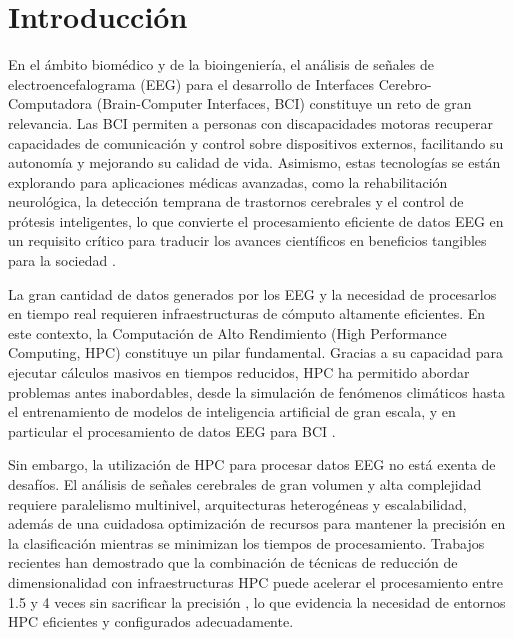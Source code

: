 \chapter{Introducción}\label{cap:introduccion}



En el ámbito biomédico y de la bioingeniería, el análisis de señales de electroencefalograma (\ac{EEG}) para el desarrollo de Interfaces Cerebro-Computadora (Brain-Computer Interfaces, \ac{BCI}) constituye un reto de gran relevancia. Las \ac{BCI} permiten a personas con discapacidades motoras recuperar capacidades de comunicación y control sobre dispositivos externos, facilitando su autonomía y mejorando su calidad de vida. Asimismo, estas tecnologías se están explorando para aplicaciones médicas avanzadas, como la rehabilitación neurológica, la detección temprana de trastornos cerebrales y el control de prótesis inteligentes, lo que convierte el procesamiento eficiente de datos \ac{EEG} en un requisito crítico para traducir los avances científicos en beneficios tangibles para la sociedad \cite{mcfarland2017eeg, Lotte2015ElectroencephalographyB}.

La gran cantidad de datos generados por los \ac{EEG} y la necesidad de procesarlos en tiempo real requieren infraestructuras de cómputo altamente eficientes. En este contexto, la Computación de Alto Rendimiento (High Performance Computing, HPC) constituye un pilar fundamental. Gracias a su capacidad para ejecutar cálculos masivos en tiempos reducidos, HPC ha permitido abordar problemas antes inabordables, desde la simulación de fenómenos climáticos hasta el entrenamiento de modelos de inteligencia artificial de gran escala, y en particular el procesamiento de datos \ac{EEG} para \ac{BCI} \cite{2025HighPerformanceCF}.

Sin embargo, la utilización de HPC para procesar datos \ac{EEG} no está exenta de desafíos. El análisis de señales cerebrales de gran volumen y alta complejidad requiere paralelismo multinivel, arquitecturas heterogéneas y escalabilidad, además de una cuidadosa optimización de recursos para mantener la precisión en la clasificación mientras se minimizan los tiempos de procesamiento. Trabajos recientes han demostrado que la combinación de técnicas de reducción de dimensionalidad con infraestructuras HPC puede acelerar el procesamiento entre 1.5 y 4 veces sin sacrificar la precisión \cite{mcfarland2017eeg, Lotte2015ElectroencephalographyB, 2025HighPerformanceCF}, lo que evidencia la necesidad de entornos HPC eficientes y configurados adecuadamente.

